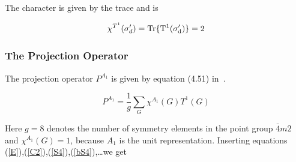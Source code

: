 The character is given by the trace and is 

\begin{equation}
\chi^{T^1}(\sigma'_d)=\rm Tr \{ T^1(\sigma'_d) \}=2
\end{equation}




\subsubsection{The Projection Operator}
The projection operator $P^{A_1}$ is given by equation (4.51) in~\cite{elliott79-1}.

\begin{equation}
P^{A_1}=\frac{1}{g} \sum_G \chi^{A_1}(G) T^1(G)
\end{equation}

Here $g=8$ denotes the number of symmetry elements in the point group $\bar 4 m 2$ and
$\chi^{A_1}(G)=1$, because $A_1$ is the unit representation.
Inserting equations (\ref{E}),(\ref{C2}),(\ref{S4}),(\ref{bS4}),\dots we get

